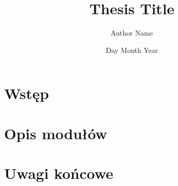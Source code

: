 \documentclass[12pt,twoside]{report}
\title{Thesis Title}
\author{Author Name}
\date{Day Month Year}
\begin{document}
	
	\tableofcontents	
	
	\chapter{Wstęp}
    

    \chapter{Opis modułów}
    

	  \chapter{Uwagi końcowe}
    
\end{document}
